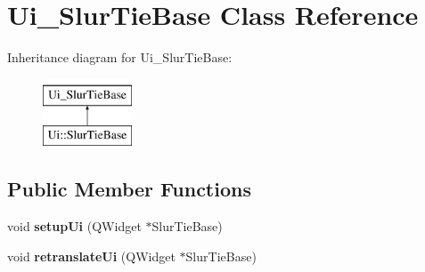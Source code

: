 \hypertarget{class_ui___slur_tie_base}{}\section{Ui\+\_\+\+Slur\+Tie\+Base Class Reference}
\label{class_ui___slur_tie_base}
Inheritance diagram for Ui\+\_\+\+Slur\+Tie\+Base\+:\begin{figure}[H]
\begin{center}
\leavevmode
\includegraphics[height=2.000000cm]{class_ui___slur_tie_base}
\end{center}
\end{figure}
\subsection*{Public Member Functions}
\begin{DoxyCompactItemize}
\item 
\mbox{\label{class_ui___slur_tie_base_a6880a9c6961a1bd1bf0be0159f60646b}} 
void {\bfseries setup\+Ui} (Q\+Widget $\ast$Slur\+Tie\+Base)
\item 
\mbox{\label{class_ui___slur_tie_base_a067ec807f5dcc0af6edeb0935f1f98a4}} 
void {\bfseries retranslate\+Ui} (Q\+Widget $\ast$Slur\+Tie\+Base)
\end{DoxyCompactItemize}
